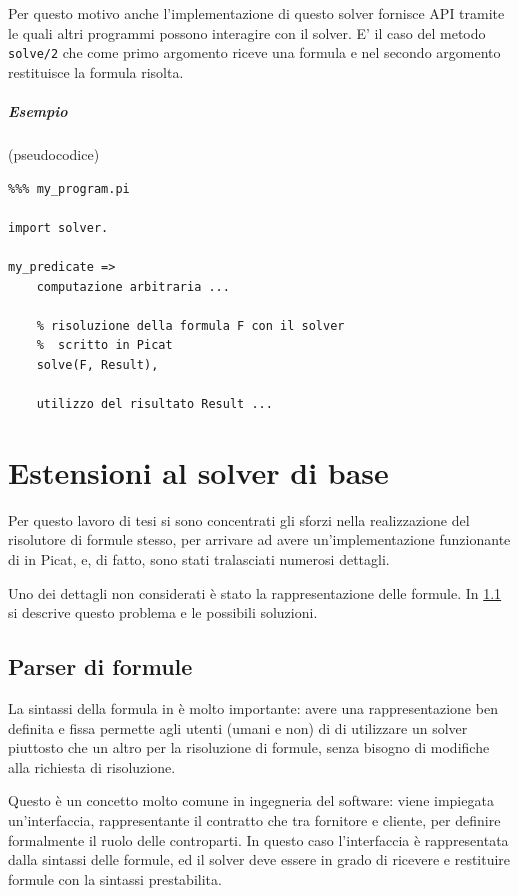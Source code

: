 \documentclass[12pt,a4paper,openright]{book} %
\begin{document}
Per questo motivo anche l'implementazione di questo solver fornisce
API tramite le quali altri programmi possono interagire con il
solver. E' il caso del metodo \verb|solve/2| che come primo argomento
riceve una formula e nel secondo argomento restituisce la formula
risolta.

\paragraph{Esempio} (pseudocodice)
\begin{verbatim}
%%% my_program.pi

import solver.

my_predicate =>
    computazione arbitraria ...

    % risoluzione della formula F con il solver
    %  scritto in Picat
    solve(F, Result),

    utilizzo del risultato Result ...
\end{verbatim}



\chapter{Estensioni al solver di base}
\label{ch:ext}

\minitoc

Per questo lavoro di tesi si sono concentrati gli sforzi nella
realizzazione del risolutore di formule stesso, per arrivare ad avere
un'implementazione funzionante di \lset{} in Picat, e, di fatto, sono
stati tralasciati numerosi dettagli.

Uno dei dettagli non considerati è stato la rappresentazione delle
formule. In \ref{sec:ext_formulas} si descrive questo problema e le
possibili soluzioni.

\section{Parser di formule}
\label{sec:ext_formulas}

La sintassi della formula in \lset{} è molto importante: avere una
rappresentazione ben definita e fissa permette agli utenti (umani e
non) di \lset{} di utilizzare un solver piuttosto che un altro per la
risoluzione di formule, senza bisogno di modifiche alla richiesta di
risoluzione.

Questo è un concetto molto comune in ingegneria del software: viene
impiegata un'interfaccia, rappresentante il contratto che tra
fornitore e cliente, per definire formalmente il ruolo delle
controparti. In questo caso l'interfaccia è rappresentata dalla
sintassi delle formule, ed il solver deve essere in grado di ricevere
e restituire formule con la sintassi prestabilita.
\end{document}

